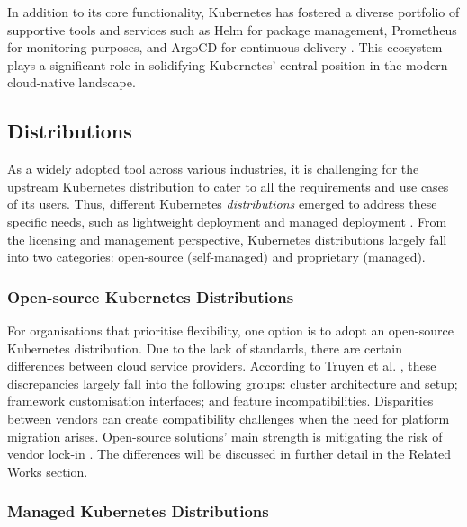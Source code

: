 In addition to its core functionality, Kubernetes has fostered a diverse portfolio of supportive tools and services such as Helm for package management, Prometheus for monitoring purposes, and ArgoCD for continuous delivery \cite{Helm, prometheusOverviewPrometheus, ArgoCDDeclarative}. This ecosystem plays a significant role in solidifying Kubernetes' central position in the modern cloud-native landscape.

\subsection{Distributions}
As a widely adopted tool across various industries, it is challenging for the upstream Kubernetes distribution to cater to all the requirements and use cases of its users. Thus, different Kubernetes \textit{distributions} emerged to address these specific needs, such as lightweight deployment and managed deployment \cite{bohmProfilingLightweightContainer2021, pereiraferreiraPerformanceEvaluationContainers2019}. From the licensing and management perspective, Kubernetes distributions largely fall into two categories: open-source (self-managed) and proprietary (managed).

\subsubsection{Open-source Kubernetes Distributions}

For organisations that prioritise flexibility, one option is to adopt an open-source Kubernetes distribution. Due to the lack of standards, there are certain differences between cloud service providers. According to Truyen et al. \cite{truyenManagingFeatureCompatibility2020}, these discrepancies largely fall into the following groups: cluster architecture and setup; framework customisation interfaces; and feature incompatibilities. Disparities between vendors can create compatibility challenges when the need for platform migration arises. Open-source solutions' main strength is mitigating the risk of vendor lock-in \cite{shaikh2011total}. The differences will be discussed in further detail in the Related Works section.

\subsubsection{Managed Kubernetes Distributions}

